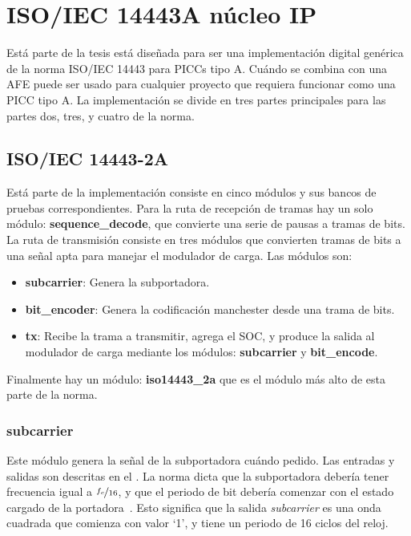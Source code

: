 \documentclass[a4paper, twoside, 11pt]{report}
\begin{document}
\FloatBarrier
\section{ISO/IEC 14443A núcleo IP}

Está parte de la tesis está diseñada para ser una implementación digital genérica de la norma ISO/IEC 14443 para PICCs tipo A. Cuándo se combina con una AFE puede ser usado para cualquier proyecto que requiera funcionar como una PICC tipo A. La implementación  se divide en tres partes principales para las partes dos, tres, y cuatro de la norma.

\FloatBarrier
\subsection{ISO/IEC 14443-2A}

Está parte de la implementación consiste en cinco módulos y sus bancos de pruebas correspondientes. Para la ruta de recepción de tramas hay un solo módulo: \textbf{sequence\_decode}, que convierte una serie de pausas a tramas de bits. La ruta de transmisión consiste en tres módulos que convierten tramas de bits a una señal apta para manejar el modulador de carga. Las módulos son:

\begin{itemize}
  \item \textbf{subcarrier}: Genera la subportadora.
  \item \textbf{bit\_encoder}: Genera la codificación manchester desde una trama de bits.
  \item \textbf{tx}: Recibe la trama a transmitir, agrega el SOC, y produce la salida al modulador de carga mediante los módulos: \textbf{subcarrier} y \textbf{bit\_encode}.
\end{itemize}

Finalmente hay un módulo: \textbf{iso14443\_2a} que es el módulo más alto de esta parte de la norma.

\FloatBarrier
\subsubsection{subcarrier}

Este módulo genera la señal de la subportadora cuándo pedido. Las entradas y salidas son descritas en el . La norma dicta que la subportadora debería tener frecuencia igual a $\nicefrac{f_c}{16}$, y que el periodo de bit debería comenzar con el estado cargado de la portadora~\cite{iso14443-2}. Esto significa que la salida \textit{subcarrier} es una onda cuadrada que comienza con valor ‘1’, y tiene un periodo de 16 ciclos del reloj.
\end{document}
